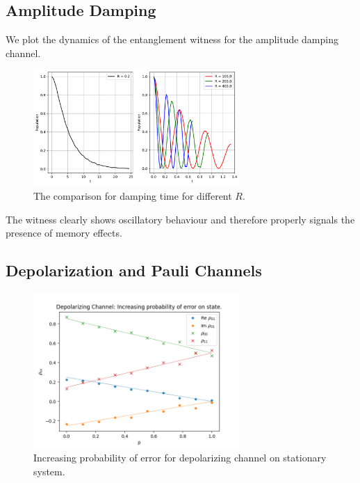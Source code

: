 \documentclass[12pt]{article}
\begin{document}
  \subsection{Amplitude Damping}
  We plot the dynamics of the entanglement witness for the amplitude damping channel.

  \begin{figure}
    \centering
    \includegraphics[width=0.7\textwidth]{images/amplitude_damping_population_non_markovianity.pdf}
    \caption{The comparison for damping time for different \( R \).%
      \label{fig:amplitude_damping_population}}
  \end{figure}

  The witness clearly shows oscillatory behaviour and therefore properly signals the presence of memory effects.


  \subsection{Depolarization and Pauli Channels}

  \begin{figure}
    \centering
    \includegraphics[width=0.7\textwidth]{images/depolarizing_probability_state.png}
    \caption{Increasing probability of error for depolarizing channel on stationary system.%
      \label{fig:depolarizing_probability_state}}
  \end{figure}
\end{document}
